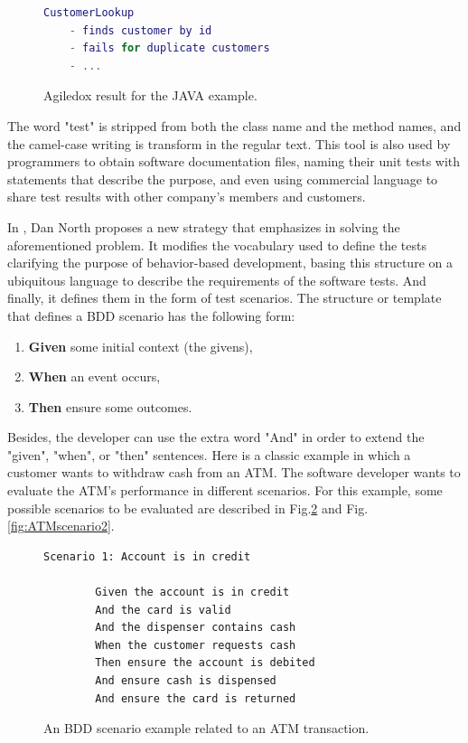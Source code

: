 \documentclass[journal]{IEEEtran}	%
\begin{document}
\begin{figure}[t!]
\centering
\begin{lstlisting}[language=Matlab]
    CustomerLookup
    - finds customer by id
    - fails for duplicate customers
    - ...
\end{lstlisting}
\caption{Agiledox result for the JAVA example.}
\label{fig:agiledox}
\end{figure}

The word "test" is stripped from both the class name and the method names, and the camel-case writing is transform in the regular text. This tool is also used by programmers to obtain software documentation files, naming their unit tests with statements that describe the purpose, and even using commercial language to share test results with other company's members and customers.

In \cite{north2010introducing}, Dan North proposes a new strategy that emphasizes in solving the aforementioned problem. It modifies the vocabulary used to define the tests clarifying the purpose of behavior-based development, basing this structure on a ubiquitous language to describe the requirements of the software tests. And finally, it defines them in the form of test scenarios. The structure or template that defines a BDD scenario has the following form:

\begin{enumerate}
    \item \textbf{Given} some initial context (the givens),
    \item \textbf{When} an event occurs,
    \item \textbf{Then} ensure some outcomes. 
\end{enumerate}

Besides, the developer can use the extra word "And" in order to extend the "given", "when", or "then" sentences. Here is a classic example in which a customer wants to withdraw cash from an ATM. The software developer wants to evaluate the ATM's performance in different scenarios. For this example, some possible scenarios to be evaluated are described in Fig.\ref{fig:ATMscenario1} and Fig. \ref{fig:ATMscenario2}.

\begin{figure}[t!]
\centering
\begin{lstlisting}[]
    Scenario 1: Account is in credit

        Given the account is in credit
        And the card is valid
        And the dispenser contains cash
        When the customer requests cash
        Then ensure the account is debited
        And ensure cash is dispensed
        And ensure the card is returned
\end{lstlisting}
\caption{An BDD scenario example related to an ATM transaction.}
\label{fig:ATMscenario1}
\end{figure}
\end{document}
